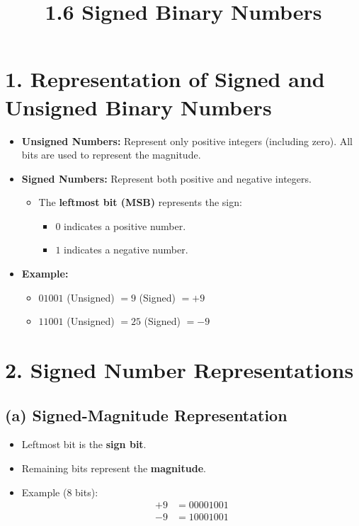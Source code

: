 \documentclass[a4paper,12pt]{article}
\begin{document}
\title{\textbf{{1.6} Signed Binary Numbers}}
\author{}
\date{}
\maketitle

\section*{1. Representation of Signed and Unsigned Binary Numbers}

\begin{itemize}
    \item \textbf{Unsigned Numbers:} Represent only positive integers (including zero). All bits are used to represent the magnitude.
    \item \textbf{Signed Numbers:} Represent both positive and negative integers.
    \begin{itemize}
        \item The \textbf{leftmost bit (MSB)} represents the sign:
        \begin{itemize}
            \item $0$ indicates a positive number.
            \item $1$ indicates a negative number.
        \end{itemize}
    \end{itemize}
    \item \textbf{Example:}
    \begin{itemize}
        \item $01001$ (Unsigned) $= 9$ \quad (Signed) $= +9$
        \item $11001$ (Unsigned) $= 25$ \quad (Signed) $= -9$
    \end{itemize}
\end{itemize}

\section*{2. Signed Number Representations}

\subsection*{(a) Signed-Magnitude Representation}
\begin{itemize}
    \item Leftmost bit is the \textbf{sign bit}.
    \item Remaining bits represent the \textbf{magnitude}.
    \item Example (8 bits):
    \begin{align*}
        +9 & = 00001001 \\
        -9 & = 10001001
    \end{align*}
\end{itemize}
\end{document}
